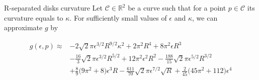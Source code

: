 \begin{claim}{R-separated disks curvature}\label{claim:r-separated-disks}
 Let $\mathcal{C} \in \mathbb{R}^2$ be a curve such that for a point $p \in \mathcal{C}$ its curvature equals to $\kappa$. For sufficiently small values of $\epsilon$ and $\kappa$, we can approximate $g$ by

\begin{align*}
g(\epsilon,p) \approx &-2 \sqrt{2}\pi \epsilon^{3/2}R^{9/2}\kappa^2 + 2\pi^2R^4 + 8\pi^2\epsilon R^3\\
 &- \frac{16}{3}\sqrt{2}\pi\epsilon^{3/2}R^{5/2} + 12\pi^2\epsilon^2R^2 - \frac{188}{15}\sqrt{2}\pi\epsilon^{5/2}R^{3/2} \\ 
 &+ \frac{8}{9}\big(9\pi^2 +8\big)\epsilon^3R - \frac{611}{70}\sqrt{2}\pi\epsilon^{7/2}\sqrt{R} + \frac{2}{45}\big(45\pi^2 + 112\big)\epsilon^4
\end{align*} 
\end{claim}


